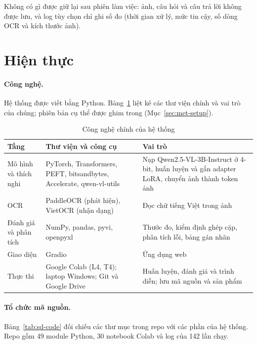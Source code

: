 Không có gì được giữ lại sau phiên làm việc: ảnh, câu hỏi và câu trả lời không được lưu,
và log tùy chọn chỉ ghi số đo (thời gian xử lý, mức tin cậy, số dòng OCR và kích thước
ảnh).

\section{Hiện thực}
\label{sec:sd-impl}

\paragraph{Công nghệ.} Hệ thống được viết bằng Python. Bảng~\ref{tab:sd-stack} liệt kê các
thư viện chính và vai trò của chúng; phiên bản cụ thể được ghim trong
 (Mục~\ref{sec:met-setup}).

\begin{table}[htbp]
\caption{Công nghệ chính của hệ thống}
\label{tab:sd-stack}
\centering
\small
\begin{tabular}{p{}p{}p{}}
\toprule
\raggedright \textbf{Tầng} & \raggedright \textbf{Thư viện và công cụ} & \raggedright \textbf{Vai trò} \tabularnewline
\midrule
\raggedright Mô hình và thích nghi & \raggedright PyTorch, Transformers, PEFT, bitsandbytes, Accelerate, qwen-vl-utils & \raggedright Nạp Qwen2.5-VL-3B-Instruct ở 4-bit, huấn luyện và gắn adapter LoRA, chuyển ảnh thành token ảnh \tabularnewline
\raggedright OCR & \raggedright PaddleOCR (phát hiện), VietOCR (nhận dạng) & \raggedright Đọc chữ tiếng Việt trong ảnh \tabularnewline
\raggedright Đánh giá và phân tích & \raggedright NumPy, pandas, pyvi, openpyxl & \raggedright Thước đo, kiểm định ghép cặp, phân tích lỗi, bảng gán nhãn \tabularnewline
\raggedright Giao diện & \raggedright Gradio & \raggedright Ứng dụng web \tabularnewline
\raggedright Thực thi & \raggedright Google Colab (L4, T4); laptop Windows; Git và Google Drive & \raggedright Huấn luyện, đánh giá và trình diễn; lưu mã nguồn và sản phẩm \tabularnewline
\bottomrule
\end{tabular}
\end{table}

\paragraph{Tổ chức mã nguồn.} Bảng~\ref{tab:sd-code} đối chiếu các thư mục trong repo với các
phần của hệ thống. Repo gồm 49 module Python, 30 notebook Colab và log của 142 lần chạy.

